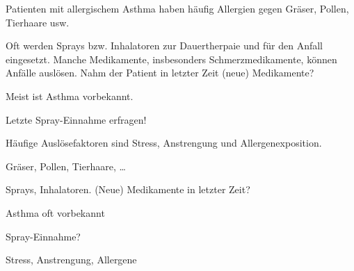\TextSlide
{{\TxSAMPLER}}
{%
\begin{SAMPLERText}
  \item[\SAMPLER{A}] Patienten mit allergischem Asthma haben
  häufig Allergien gegen Gräser, Pollen, Tierhaare usw.
  \item[\SAMPLER{M}] Oft werden Sprays bzw. Inhalatoren zur
  Dauertherpaie und für den Anfall eingesetzt. Manche
  Medikamente, insbesonders Schmerzmedikamente, können
  Anfälle auslösen.%
  Nahm der Patient in letzter Zeit (neue)
  Medikamente?
  \item[\SAMPLER{P}] Meist ist Asthma vorbekannt. 
  \item[\SAMPLER{L}] Letzte Spray-Einnahme erfragen!
  \item[\SAMPLER{E}] Häufige Auslösefaktoren sind Stress,
  Anstrengung und Allergenexposition.
\end{SAMPLERText}
}
{
\begin{SAMPLERSlide}
  \item[\SAMPLER{A}] Gräser, Pollen, Tierhaare, \ldots
  \item[\SAMPLER{M}] Sprays, Inhalatoren. (Neue) Medikamente in letzter Zeit?
  \item[\SAMPLER{P}] Asthma oft vorbekannt
  \item[\SAMPLER{L}] Spray-Einnahme?
  \item[\SAMPLER{E}] Stress, Anstrengung, Allergene
\end{SAMPLERSlide}
}
{}
{}
{}




%     




